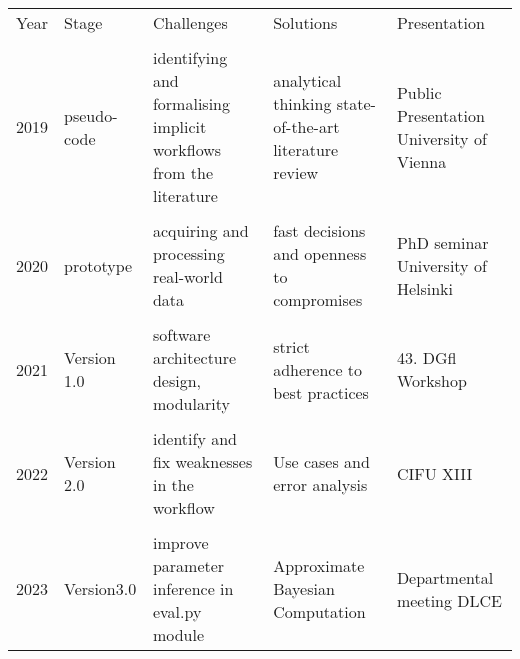 \begin{flushleft}
\renewcommand{\arraystretch}{0.8}
\begin{tabular}{p{1cm}p{3cm}p{4cm}p{4cm}p{8cm}}
Year&Stage&Challenges&Solutions&Presentation\\
&&&&\\
2019&pseudo-code&identifying and formalising implicit workflows from the literature&analytical thinking \newline state-of-the-art literature review&Public Presentation \newline University of Vienna\\
&&&\\
2020&prototype&acquiring and processing real-world data&fast decisions and openness to compromises&PhD seminar \newline University of Helsinki\\
&&&\\
2021&Version 1.0&software architecture design, modularity&strict adherence to best practices&43. DGfl Workshop\\
&&&\\
2022&Version 2.0&identify and fix weaknesses in the workflow&Use cases and error analysis&CIFU XIII\\
&&&\\
2023&Version3.0&improve parameter inference in eval.py module&Approximate Bayesian Computation&Departmental meeting DLCE
\end{tabular}
\end{flushleft}